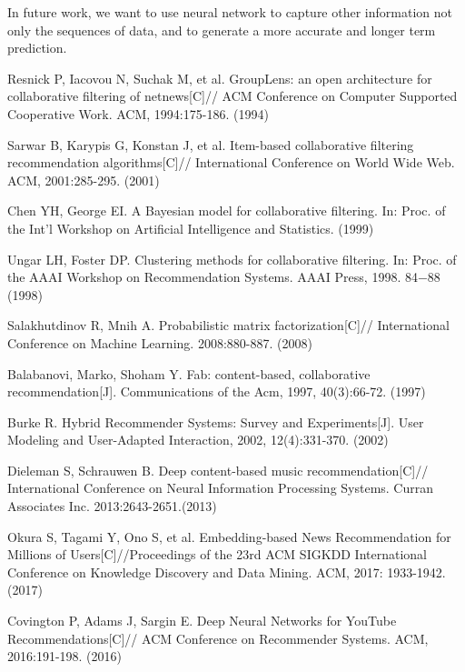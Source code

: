 \documentclass[runningheads]{llncs}
\begin{document}
In future work, we want to use neural network to capture other information not only the sequences of data, and to generate a more accurate and longer term prediction.

%
%
%
% 
% 
%
\begin{thebibliography}{8}
 Resnick P, Iacovou N, Suchak M, et al. GroupLens: an open architecture for collaborative filtering of netnews[C]// ACM Conference on Computer Supported Cooperative Work. ACM, 1994:175-186. (1994)

 Sarwar B, Karypis G, Konstan J, et al. Item-based collaborative filtering recommendation algorithms[C]// International Conference on World Wide Web. ACM, 2001:285-295. (2001)

 Chen YH, George EI. A Bayesian model for collaborative filtering. In: Proc. of the Int’l Workshop on Artificial Intelligence and Statistics. (1999)

 Ungar LH, Foster DP. Clustering methods for collaborative filtering. In: Proc. of the AAAI Workshop on Recommendation
Systems. AAAI Press, 1998. 84−88 (1998)

 Salakhutdinov R, Mnih A. Probabilistic matrix factorization[C]// International Conference on Machine Learning. 2008:880-887. (2008)

 Balabanovi, Marko, Shoham Y. Fab: content-based, collaborative recommendation[J]. Communications of the Acm, 1997, 40(3):66-72. (1997)

 Burke R. Hybrid Recommender Systems: Survey and Experiments[J]. User Modeling and User-Adapted Interaction, 2002, 12(4):331-370. (2002)

 Dieleman S, Schrauwen B. Deep content-based music recommendation[C]// International Conference on Neural Information Processing Systems. Curran Associates Inc. 2013:2643-2651.(2013)

 Okura S, Tagami Y, Ono S, et al. Embedding-based News Recommendation for Millions of Users[C]//Proceedings of the 23rd ACM SIGKDD International Conference on Knowledge Discovery and Data Mining. ACM, 2017: 1933-1942. (2017)

 Covington P, Adams J, Sargin E. Deep Neural Networks for YouTube Recommendations[C]// ACM Conference on Recommender Systems. ACM, 2016:191-198. (2016)


\end{thebibliography}
\end{document}
